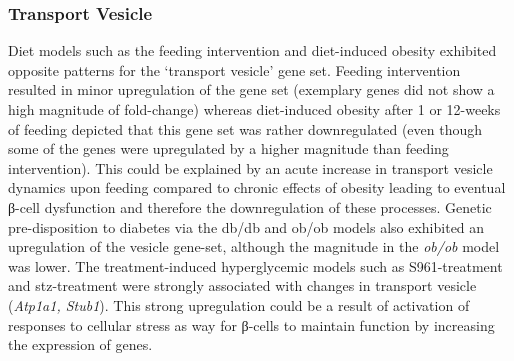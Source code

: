 \subsubsection{Transport Vesicle}
Diet models such as the feeding intervention and diet-induced obesity exhibited opposite patterns for the ‘transport vesicle’ gene set.  Feeding intervention resulted in minor upregulation of the gene set (exemplary genes did not show a high magnitude of fold-change) whereas diet-induced obesity after 1 or 12-weeks of feeding depicted that this gene set was rather downregulated (even though some of the genes were upregulated by a higher magnitude than feeding intervention). This could be explained by an acute increase in transport vesicle dynamics upon feeding compared to chronic effects of obesity leading to eventual β-cell dysfunction and therefore the downregulation of these processes. Genetic pre-disposition to diabetes via the db/db and ob/ob models also exhibited an upregulation of the vesicle gene-set, although the magnitude in the  \textit{ob/ob} model was lower. The treatment-induced hyperglycemic models such as S961-treatment and \gls{stz}-treatment were strongly associated with changes in transport vesicle (\textit{Atp1a1, Stub1}). This strong upregulation could be a result of activation of responses to cellular stress as way for β-cells to maintain function by increasing the expression of genes.\\



